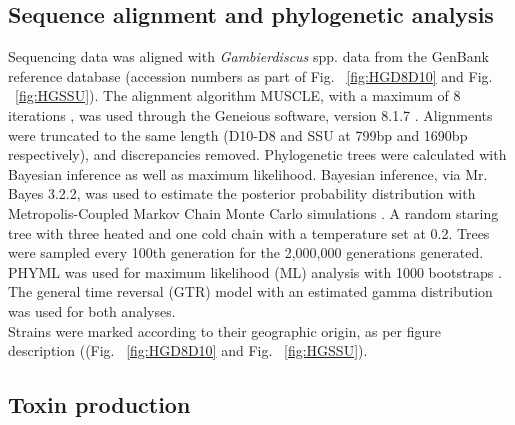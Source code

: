 \documentclass[12pt]{article}
\begin{document}
\subsection{Sequence alignment and phylogenetic analysis}
Sequencing data was aligned with \emph{Gambierdiscus} spp. data from the GenBank reference database (accession numbers as part of Fig. ~\ref{fig:HGD8D10} and Fig. ~\ref{fig:HGSSU}). The alignment algorithm MUSCLE, with a maximum of 8 iterations \citep{edgar2004muscle}, was used through the Geneious software, version 8.1.7 \citep{kearse2012geneious}. Alignments were truncated to the same length (D10-D8 and SSU at 799bp and 1690bp respectively), and discrepancies removed.
Phylogenetic trees were calculated with Bayesian inference as well as maximum likelihood. Bayesian inference, via Mr. Bayes 3.2.2, was used to estimate the posterior probability distribution with Metropolis-Coupled Markov Chain Monte Carlo simulations \citep{ronquist2003mrbayes}. A random staring tree with three heated and one cold chain with a temperature set at 0.2. Trees were sampled every 100th generation for the 2,000,000 generations generated.
PHYML was used for maximum likelihood (ML) analysis with 1000 bootstraps \citep{guindon2003simple}.
The general time reversal (GTR) model with an estimated gamma distribution was used for both analyses.\\
Strains were marked according to their geographic origin, as per figure description ((Fig. ~\ref{fig:HGD8D10} and Fig. ~\ref{fig:HGSSU}).

\subsection{Toxin production}
\end{document}
